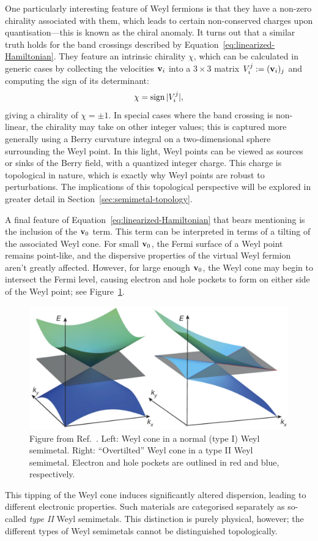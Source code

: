 One particularly interesting feature of Weyl fermions is that they have a non-zero chirality associated with them, which leads to certain non-conserved charges upon quantisation---this is known as the chiral anomaly. It turns out that a similar truth holds for the band crossings described by Equation~\eqref{eq:linearized-Hamiltonian}. They feature an intrinsic chirality $\chi$, which can be calculated in generic cases by collecting the velocities $\vb{v}_i$ into a $3\times 3$ matrix $V_i^j := (\vb{v}_i)_j$ and computing the sign of its determinant:
\begin{equation}\label{eq:determinant_chirality}
	\chi = \operatorname{sign}{|V_i^j|},
\end{equation} 
giving a chirality of $\chi=\pm1$. In special cases where the band crossing is non-linear, the chirality may take on other integer values; this is captured more generally using a Berry curvature integral on a two-dimensional sphere surrounding the Weyl point. In this light, Weyl points can be viewed as sources or sinks of the Berry field, with a quantized integer charge. This charge is topological in nature, which is exactly why Weyl points are robust to perturbations. The implications of this topological perspective will be explored in greater detail in Section~\ref{sec:semimetal-topology}.

A final feature of Equation~\eqref{eq:linearized-Hamiltonian} that bears mentioning is the inclusion of the $\vb{v}_0$ term. This term can be interpreted in terms of a tilting of the associated Weyl cone. For small $\vb{v}_0$, the Fermi surface of a Weyl point remains point-like, and the dispersive properties of the virtual Weyl fermion aren't greatly affected. However, for large enough $\vb{v}_0$, the Weyl cone may begin to intersect the Fermi level, causing electron and hole pockets to form on either side of the Weyl point; see Figure~\ref{fig:Weyl-cone-tilt}.
\begin{figure}[htb!]
	\centering
	\includegraphics[width=.7\linewidth]{Images/Weyl-cone-tilt}
	\caption{Figure from Ref.~\cite{Soluyanov_Type-II}. Left: Weyl cone in a normal (type I) Weyl semimetal. Right: ``Overtilted'' Weyl cone in a type II Weyl semimetal. Electron and hole pockets are outlined in red and blue, respectively.}
	\label{fig:Weyl-cone-tilt}
\end{figure}
This tipping of the Weyl cone induces significantly altered dispersion, leading to different electronic properties. Such materials are categorised separately as so-called \emph{type II} Weyl semimetals. %
This distinction is purely physical, however; the different types of Weyl semimetals cannot be distinguished topologically.

